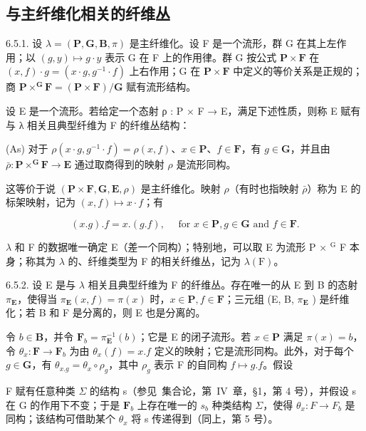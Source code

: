 \subsection{与主纤维化相关的纤维丛}

6.5.1. 设 \(\lambda = (\mathbf{P}, \mathbf{G}, \mathbf{B}, \pi)\) 是主纤维化。设 F 是一个流形，群 G 在其上左作用；以 \((g, y) \mapsto g \cdot y\) 表示 G 在 F 上的作用律。群 G 按公式 \(\mathbf{P} \times \mathbf{F}\) 在 \((x, f) \cdot g = (x \cdot g, g^{-1} \cdot f)\) 上右作用；G 在 \(\mathbf{P} \times \mathbf{F}\) 中定义的等价关系是正规的；商 \(\mathbf{P} \times^{\mathbf{G}}\mathbf{F} = (\mathbf{P} \times \mathbf{F}) / \mathbf{G}\) 赋有流形结构。

设 E 是一个流形。若给定一个态射 ρ : P × F → E，满足下述性质，则称 E 赋有与 λ 相关且典型纤维为 F 的纤维丛结构：

(As) 对于 \(\rho(x \cdot g,g^{-1} \cdot f)=\rho(x,f)\)、\(x\in\mathbf{P}\)、\(f\in\mathbf{F}\)，有 \(g\in\mathbf{G}\)，并且由 \(\bar{\rho}:\mathbf{P}\times^{\mathbf{G}}\mathbf{F}\to\mathbf{E}\) 通过取商得到的映射 \(\rho\) 是流形同构。

这等价于说 \((\mathbf{P} \times \mathbf{F}, \mathbf{G}, \mathbf{E}, \rho)\) 是主纤维化。映射 \(\rho\)（有时也指映射 \(\bar{\rho}\)）称为 E 的标架映射，记为 \((x, f) \mapsto x \cdot f\)；有

\[
(x. g). f = x. (g. f), \quad \text {   for   } x \in \mathbf {P}, g \in \mathbf {G} \text {   and   } f \in \mathbf {F}.
\]

\(\lambda\) 和 F 的数据唯一确定 E（差一个同构）；特别地，可以取 E 为流形 P × \(^{\text{G}}\) F 本身；称其为 \(\lambda\) 的、纤维类型为 F 的相关纤维丛，记为 \(\lambda(\text{F})\)。

6.5.2. 设 E 是与 \(\lambda\) 相关且典型纤维为 F 的纤维丛。存在唯一的从 E 到 B 的态射 \(\pi_{\mathbf{E}}\)，使得当 \(\pi_{\mathbf{E}}(x,f)=\pi(x)\) 时，\(x\in\mathbf{P},f\in\mathbf{F}\)；三元组 (E, B, \(\pi_{\mathbf{E}}\) ) 是纤维化；若 B 和 F 是分离的，则 E 也是分离的。

令 \(b \in \mathbf{B}\)，并令 \(\mathbf{F}_b = \pi_{\mathbf{E}}^{-1}(b)\)；它是 E 的闭子流形。若 \(x \in \mathbf{P}\) 满足 \(\pi(x) = b\)，令 \(\theta_x: \mathbf{F} \to \mathbf{F}_b\) 为由 \(\theta_x(f) = x.f\) 定义的映射；它是流形同构。此外，对于每个 \(g \in \mathbf{G}\)，有 \(\theta_{x.g} = \theta_x \circ \rho_g\)，其中 \(\rho_g\) 表示 F 的自同构 \(f \mapsto g.f\)。假设

F 赋有任意种类 \(\Sigma\) 的结构 s（参见~集合论，第~IV~章，§1，第 4 号），并假设 s 在 G 的作用下不变；于是 \(\mathbf{F}_{b}\) 上存在唯一的 \(s_{b}\) 种类结构 \(\Sigma\)，使得 \(\theta_{x}: F \to F_{b}\) 是同构；该结构可借助某个 \(\theta_{x}\) 将 s 传递得到（同上，第 5 号）。

